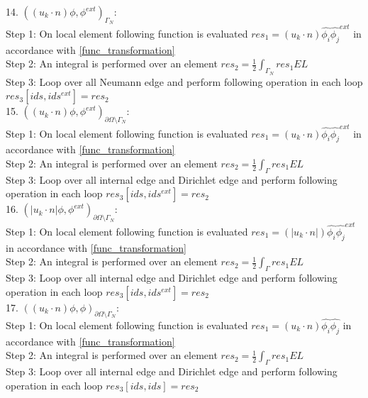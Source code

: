 \documentclass[a4paper,12pt]{book}
\begin{document}
14. $((u_k \cdot n)\phi,\phi^{ext})_{\Gamma_N}$:\\
Step 1: On local element following function is evaluated $res_1 = (u_k \cdot n) \hat{\phi_i} \hat{\phi_j}^{ext} $ in accordance with \ref{func_transformation}\\
Step 2: An integral is performed over an element $res_2 = \frac{1}{2} \int_{\Gamma_N} res_1 EL $\\
Step 3: Loop over all Neumann edge and perform following operation in each loop $res_3[ids,ids^{ext}] = res_2$\\

15. $((u_k \cdot n)\phi,\phi^{ext})_{\partial \Omega \setminus \Gamma_N}$:\\
Step 1: On local element following function is evaluated $res_1 = (u_k \cdot n) \hat{\phi_i} \hat{\phi_j}^{ext} $ in accordance with \ref{func_transformation}\\
Step 2: An integral is performed over an element $res_2 = \frac{1}{2} \int_{\Gamma} res_1 EL $\\
Step 3: Loop over all internal edge and Dirichlet edge and perform following operation in each loop $res_3[ids,ids^{ext}] = res_2$\\

16. $(|u_k \cdot n| \phi,\phi^{ext})_{\partial \Omega \setminus \Gamma_N}$:\\
Step 1: On local element following function is evaluated $res_1 = (|u_k \cdot n|) \hat{\phi_i} \hat{\phi_j}^{ext} $ in accordance with \ref{func_transformation}\\
Step 2: An integral is performed over an element $res_2 = \frac{1}{2} \int_{\Gamma} res_1 EL $\\
Step 3: Loop over all internal edge and Dirichlet edge and perform following operation in each loop $res_3[ids,ids^{ext}] = res_2$\\

17. $((u_k \cdot n)\phi,\phi)_{\partial \Omega \setminus \Gamma_N}$:\\
Step 1: On local element following function is evaluated $res_1 = (u_k \cdot n) \hat{\phi_i} \hat{\phi_j} $ in accordance with \ref{func_transformation}\\
Step 2: An integral is performed over an element $res_2 = \frac{1}{2} \int_{\Gamma} res_1 EL $\\
Step 3: Loop over all internal edge and Dirichlet edge and perform following operation in each loop $res_3[ids,ids] = res_2$\\
\end{document}
